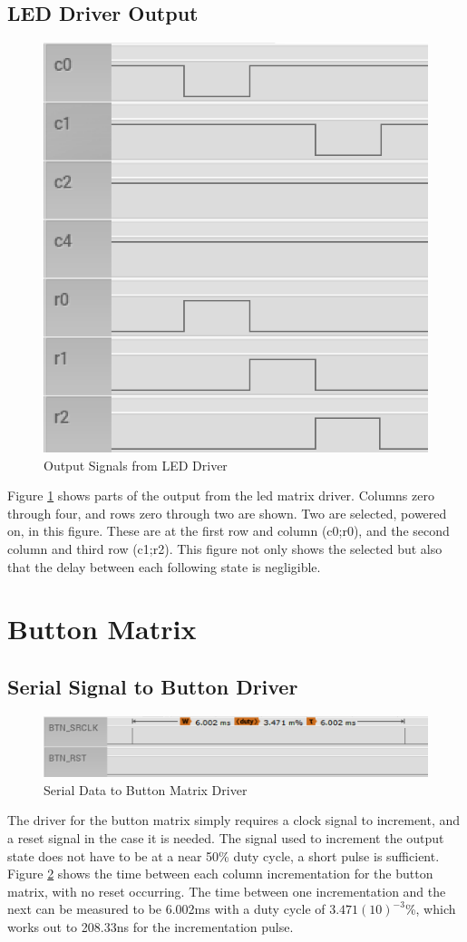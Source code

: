 \documentclass[12pt,a4paper]{report}
\begin{document}
\subsection{LED Driver Output}
\begin{figure}[h!]
	\centering
	\includegraphics[width=0.4 \textwidth]{led_parallel.PNG}
	\caption{Output Signals from LED Driver}
	\label{fig:ledDriveOut}
\end{figure}
\noindent Figure \ref{fig:ledDriveOut} shows parts of the output from the \ac{led} matrix driver. Columns zero through four, and rows zero through two are shown. Two  are selected, powered on, in this figure. These  are at the first row and column (c0;r0), and the second column and third row (c1;r2). This figure not only shows the selected  but also that the delay between each following state is negligible.
\section{Button Matrix}
\subsection{Serial Signal to Button Driver}
\begin{figure}[h!]
	\centering
	\includegraphics[width=0.6 \textwidth]{btn_serial.PNG}
	\caption{Serial Data to Button Matrix Driver}
	\label{fig:serdataBTN}
\end{figure}
\noindent The driver for the button matrix simply requires a clock signal to increment, and a reset signal in the case it is needed. The signal used to increment the output state does not have to be at a near 50\% duty cycle, a short pulse is sufficient. Figure \ref{fig:serdataBTN} shows the time between each column incrementation for the button matrix, with no reset occurring. The time between one incrementation and the next can be measured to be 6.002ms with a duty cycle of $3.471 (10)^{-3}$\%, which works out to 208.33ns for the incrementation pulse. 
\newpage
\end{document}
